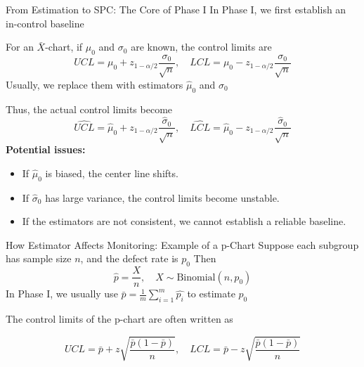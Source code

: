 \documentclass[aspectratio=169,12pt]{beamer}
\begin{document}
\begin{frame}{From Estimation to SPC: The Core of Phase I}
    In Phase I, we first establish an in-control baseline

    \vspace{0.5em}
    For an $\bar{X}$-chart, if $\mu_0$ and $\sigma_0$ are known, the control limits are
    $$
    UCL=\mu_0+z_{1-\alpha/2}\frac{\sigma_0}{\sqrt{n}},
    \quad
    LCL=\mu_0-z_{1-\alpha/2}\frac{\sigma_0}{\sqrt{n}}
    $$
    Usually, we replace them with estimators $\hat{\mu}_0$ and $\hat{\sigma}_0$
    
    \vspace{0.5em}
    Thus, the actual control limits become
    $$
    \widehat{UCL}=\hat{\mu}_0+z_{1-\alpha/2}\frac{\hat{\sigma}_0}{\sqrt{n}},
    \quad
    \widehat{LCL}=\hat{\mu}_0-z_{1-\alpha/2}\frac{\hat{\sigma}_0}{\sqrt{n}}
    $$
    \textbf{Potential issues:}
    \begin{itemize}
        \item If $\hat{\mu}_0$ is biased, the center line shifts.
        \item If $\hat{\sigma}_0$ has large variance, the control limits become unstable.
        \item If the estimators are not consistent, we cannot establish a reliable baseline.
    \end{itemize}
\end{frame}

\begin{frame}{How Estimator Affects Monitoring: Example of a p-Chart}
    Suppose each subgroup has sample size $n$, and the defect rate is $p_0$
    Then $$\hat p=\frac{X}{n}, \quad X\sim\mathrm{Binomial}(n, p_0)$$
    In Phase I, we usually use $\bar{p}=\frac1m\sum^m_{i=1}\hat{p_i}$ to estimate $p_0$ 

    The control limits of the p-chart are often written as

    $$
    UCL=\bar p + z\sqrt{\frac{\bar p(1-\bar p)}{n}},
    \quad
    LCL=\bar p - z\sqrt{\frac{\bar p(1-\bar p)}{n}}
    $$
\end{frame}
\end{document}
